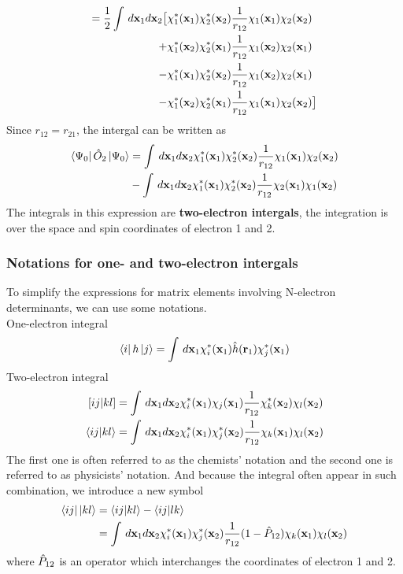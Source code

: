 \documentclass[11pt]{article}
\begin{document}
\begin{align*}
    =\frac{1}{2}\int\,d\mathbf{x}_1d\mathbf{x}_2\big[&\chi_1^*(\mathbf{x}_1)\chi_2^*(\mathbf{x}_2)\frac{1}{r_{12}}\chi_1(\mathbf{x}_1)\chi_2(\mathbf{x}_2)\notag \\
    +&\chi_1^*(\mathbf{x}_2)\chi_2^*(\mathbf{x}_1)\frac{1}{r_{12}}\chi_1(\mathbf{x}_2)\chi_2(\mathbf{x}_1)\notag \\
    -&\chi_1^*(\mathbf{x}_1)\chi_2^*(\mathbf{x}_2)\frac{1}{r_{12}}\chi_1(\mathbf{x}_2)\chi_2(\mathbf{x}_1)\notag \\
    -&\chi_1^*(\mathbf{x}_2)\chi_2^*(\mathbf{x}_1)\frac{1}{r_{12}}\chi_1(\mathbf{x}_1)\chi_2(\mathbf{x}_2)\big]
\end{align*}
Since $r_{12}=r_{21}$, the intergal can be written as
\begin{align}
    \bra{\Psi_0}\Hat{O}_2\ket{\Psi_0}&=\int\,d\mathbf{x}_1d\mathbf{x}_2\chi_1^*(\mathbf{x}_1)\chi_2^*(\mathbf{x}_2)\frac{1}{r_{12}}\chi_1(\mathbf{x}_1)\chi_2(\mathbf{x}_2) \notag \\
    &-\int\,d\mathbf{x}_1d\mathbf{x}_2\chi_1^*(\mathbf{x}_1)\chi_2^*(\mathbf{x}_2)\frac{1}{r_{12}}\chi_2(\mathbf{x}_1)\chi_1(\mathbf{x}_2)
\end{align}
The integrals in this expression are \textbf{two-electron intergals}, the integration is over the space and spin coordinates of electron 1 and 2.
\subsubsection{Notations for one- and two-electron intergals}
To simplify the expressions for matrix elements involving N-electron determinants, we can use some notations.\\
One-electron integral
\begin{equation}
    \bra{i}h\ket{j}=\int\,d\mathbf{x}_1\chi_i^*(\mathbf{x}_1)\Hat{h}(\mathbf{r}_1)\chi_j^*(\mathbf{x}_1)
\end{equation}
Two-electron integral
\begin{align}
    \left[ij|kl\right]&=\int\,d\mathbf{x}_1d\mathbf{x}_2\chi_i^*(\mathbf{x}_1)\chi_j(\mathbf{x}_1)\frac{1}{r_{12}}\chi_k^*(\mathbf{x}_2)\chi_l(\mathbf{x}_2)\\
    \braket{ij|kl}&=\int\,d\mathbf{x}_1d\mathbf{x}_2\chi_i^*(\mathbf{x}_1)\chi_j^*(\mathbf{x}_2)\frac{1}{r_{12}}\chi_k(\mathbf{x}_1)\chi_l(\mathbf{x}_2)
\end{align}
The first one is often referred to as the chemists' notation and the second one is referred to as physicists' notation. And because the integral often appear in such combination, we introduce a new symbol
\begin{equation}
    \begin{split}
        \bra{ij}\ket{kl}&=\braket{ij|kl}-\braket{ij|lk} \notag \\
        &=\int\,d\mathbf{x}_1d\mathbf{x}_2\chi_i^*(\mathbf{x}_1)\chi_j^*(\mathbf{x}_2)\frac{1}{r_{12}}(1-\Hat{P}_{12})\chi_k(\mathbf{x}_1)\chi_l(\mathbf{x}_2)
    \end{split}
\end{equation}
where $\Hat{P}_{12}$ is an operator which interchanges the coordinates of electron 1 and 2. 
\end{document}

